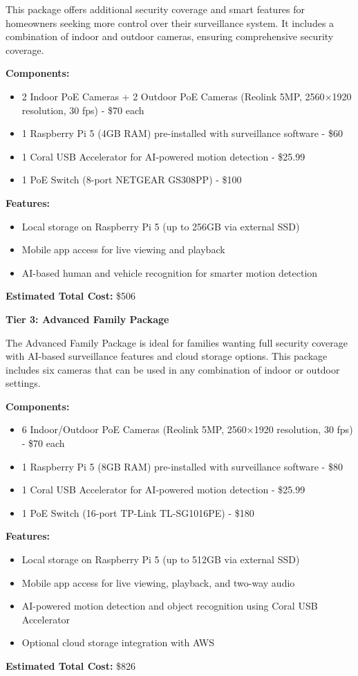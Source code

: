 \documentclass{report}
\begin{document}
This package offers additional security coverage and smart features for homeowners seeking more control over their surveillance system. It includes a combination of indoor and outdoor cameras, ensuring comprehensive security coverage.

\textbf{Components:}
\begin{itemize}
    \item 2 Indoor PoE Cameras + 2 Outdoor PoE Cameras (Reolink 5MP, 2560$\times$1920 resolution, 30 fps) - \$70 each
    \item 1 Raspberry Pi 5 (4GB RAM) pre-installed with surveillance software - \$60
    \item 1 Coral USB Accelerator for AI-powered motion detection - \$25.99
    \item 1 PoE Switch (8-port NETGEAR GS308PP) - \$100
\end{itemize}
\textbf{Features:}
\begin{itemize}
    \item Local storage on Raspberry Pi 5 (up to 256GB via external SSD)
    \item Mobile app access for live viewing and playback
    \item AI-based human and vehicle recognition for smarter motion detection
\end{itemize}
\textbf{Estimated Total Cost:} \$506

\textbf{Tier 3: Advanced Family Package}

The Advanced Family Package is ideal for families wanting full security coverage with AI-based surveillance features and cloud storage options. This package includes six cameras that can be used in any combination of indoor or outdoor settings.

\textbf{Components:}
\begin{itemize}
    \item 6 Indoor/Outdoor PoE Cameras (Reolink 5MP, 2560$\times$1920 resolution, 30 fps) - \$70 each
    \item 1 Raspberry Pi 5 (8GB RAM) pre-installed with surveillance software - \$80
    \item 1 Coral USB Accelerator for AI-powered motion detection - \$25.99
    \item 1 PoE Switch (16-port TP-Link TL-SG1016PE) - \$180
\end{itemize}
\textbf{Features:}
\begin{itemize}
    \item Local storage on Raspberry Pi 5 (up to 512GB via external SSD)
    \item Mobile app access for live viewing, playback, and two-way audio
    \item AI-powered motion detection and object recognition using Coral USB Accelerator
    \item Optional cloud storage integration with AWS
\end{itemize}
\textbf{Estimated Total Cost:} \$826
\end{document}
